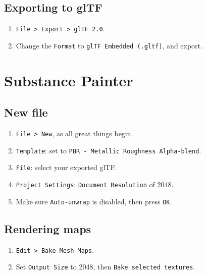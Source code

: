 \documentclass[12pt, letterpaper]{article}
\begin{document}
\subsection{Exporting to glTF}
\begin{enumerate}
    \item \verb|File > Export > glTF 2.0|.
    \item Change the \verb|Format| to \verb|glTF Embedded (.gltf)|, and export.
\end{enumerate}

\section{Substance Painter}

\subsection{New file}
\begin{enumerate}
    \item \verb|File > New|, as all great things begin.
    \item \verb|Template|: set to \verb|PBR - Metallic Roughness Alpha-blend|.
    \item \verb|File|: select your exported glTF.
    \item \verb|Project Settings|: \verb|Document Resolution| of 2048.
    \item Make sure \verb|Auto-unwrap| is disabled, then press \verb|OK|.
\end{enumerate}

\subsection{Rendering maps}
\begin{enumerate}
    \item \verb|Edit > Bake Mesh Maps|.
    \item Set \verb|Output Size| to 2048, then \verb|Bake selected textures|.
\end{enumerate}
\end{document}

